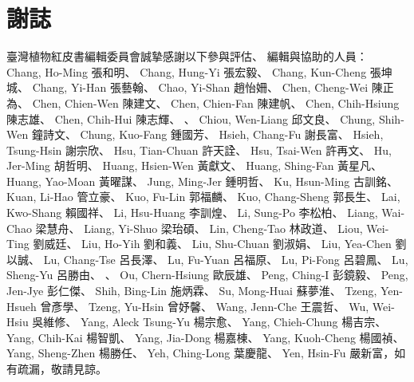 \chapter{謝誌}

\linespread{1.5}\selectfont
\normalfont\selectfont
臺灣植物紅皮書編輯委員會誠摯感謝以下參與評估、
編輯與協助的人員：\\

\noindent Chang, Ho-Ming 張和明、
Chang, Hung-Yi 張宏毅、
Chang, Kun-Cheng 張坤城、
Chang, Yi-Han 張藝翰、
Chao, Yi-Shan 趙怡姍、
Chen, Cheng-Wei 陳正為、
Chen, Chien-Wen 陳建文、
Chen, Chien-Fan 陳建帆、
Chen, Chih-Hsiung 陳志雄、
Chen, Chih-Hui 陳志輝、
、
Chiou, Wen-Liang 邱文良、
Chung, Shih-Wen 鐘詩文、
Chung, Kuo-Fang 鍾國芳、
Hsieh, Chang-Fu 謝長富、
Hsieh, Tsung-Hsin 謝宗欣、
Hsu, Tian-Chuan 許天詮、
Hsu, Tsai-Wen 許再文、
Hu, Jer-Ming 胡哲明、
Huang, Hsien-Wen 黃獻文、
Huang, Shing-Fan 黃星凡、
Huang, Yao-Moan 黃曜謀、
Jung, Ming-Jer 鍾明哲、
Ku, Hsun-Ming 古訓銘、
Kuan, Li-Hao 管立豪、
Kuo, Fu-Lin 郭福麟、
Kuo, Chang-Sheng 郭長生、
Lai, Kwo-Shang 賴國祥、
Li, Hsu-Huang 李訓煌、
Li, Sung-Po 李松柏、
Liang, Wai-Chao 梁慧舟、
Liang, Yi-Shuo 梁珆碩、
Lin, Cheng-Tao 林政道、
Liou, Wei-Ting 劉威廷、
Liu, Ho-Yih 劉和義、
Liu, Shu-Chuan 劉淑娟、
Liu, Yea-Chen 劉以誠、
Lu, Chang-Tse 呂長澤、
Lu, Fu-Yuan 呂福原、
Lu, Pi-Fong 呂碧鳳、
Lu, Sheng-Yu 呂勝由、
、
Ou, Chern-Hsiung 歐辰雄、
Peng, Ching-I 彭鏡毅、
Peng, Jen-Jye 彭仁傑、
Shih, Bing-Lin 施炳霖、
Su, Mong-Huai 蘇夢淮、
Tzeng, Yen-Hsueh 曾彥學、
Tzeng, Yu-Hsin 曾妤馨、
Wang, Jenn-Che 王震哲、
Wu, Wei-Hsiu 吳維修、
Yang, Aleck Tsung-Yu 楊宗愈、
Yang, Chieh-Chung 楊吉宗、
Yang, Chih-Kai 楊智凱、
Yang, Jia-Dong 楊嘉棟、
Yang, Kuoh-Cheng 楊國禎、
Yang, Sheng-Zhen 楊勝任、
Yeh, Ching-Long 葉慶龍、
Yen, Hsin-Fu 嚴新富，如有疏漏，敬請見諒。\\

\linespread{1}\selectfont
